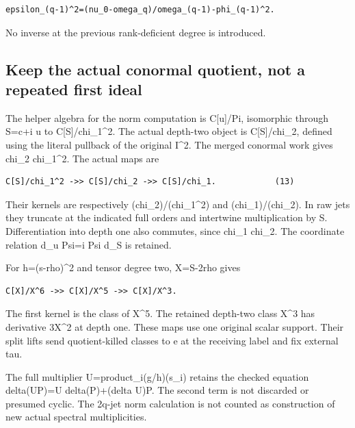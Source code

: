 \begin{Verbatim}[breaklines=true,breakanywhere=true,fontsize=\small]
epsilon_(q-1)^2=(nu_0-omega_q)/omega_(q-1)-phi_(q-1)^2.
\end{Verbatim}

No inverse at the previous rank-deficient degree is introduced.

\subsection[\hspace{0.4em}Keep the actual conormal quotient, not a repeated first
ideal]{Keep the actual conormal quotient, not a repeated first
ideal}\label{confluent-transfer-keep-the-actual-conormal-quotient-not-a-repeated-first-ideal}

The helper algebra for the norm computation is C{[}u{]}/Pi, isomorphic
through S=c+i u to C{[}S{]}/chi\_1\^{}2. The actual depth-two object is
C{[}S{]}/chi\_2, defined using the literal pullback of the original
I\^{}2. The merged conormal work gives chi\_2 \textbar{} chi\_1\^{}2.
The actual maps are

\begin{Verbatim}[breaklines=true,breakanywhere=true,fontsize=\small]
C[S]/chi_1^2 ->> C[S]/chi_2 ->> C[S]/chi_1.            (13)
\end{Verbatim}

Their kernels are respectively (chi\_2)/(chi\_1\^{}2) and
(chi\_1)/(chi\_2). In raw jets they truncate at the indicated full
orders and intertwine multiplication by S. Differentiation into depth
one also commutes, since chi\_1 \textbar{} chi\_2\textquotesingle. The
coordinate relation d\_u Psi=i Psi d\_S is retained.

For h=(s-rho)\^{}2 and tensor degree two, X=S-2rho gives

\begin{Verbatim}[breaklines=true,breakanywhere=true,fontsize=\small]
C[X]/X^6 ->> C[X]/X^5 ->> C[X]/X^3.
\end{Verbatim}

The first kernel is the class of X\^{}5. The retained depth-two class
X\^{}3 has derivative 3X\^{}2 at depth one. These maps use one original
scalar support. Their split lifts send quotient-killed classes to e at
the receiving label and fix external tau.

The full multiplier U=product\_i(g/h)(s\_i) retains the checked equation
delta(UP)=U delta(P)+(delta U)P. The second term is not discarded or
presumed cyclic. The 2q-jet norm calculation is not counted as
construction of new actual spectral multiplicities.

